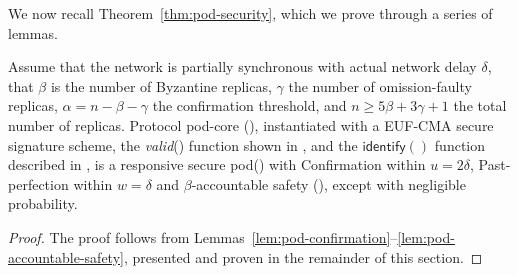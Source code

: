 \documentclass[pdflatex,sn-mathphys-num]{sn-jnl}%
\theoremstyle{thmstyleone}%
\theoremstyle{thmstyletwo}%
\theoremstyle{thmstylethree}%
\newenvironment{customthm}[1]
{\renewcommand\theinnercustomthm{#1}\innercustomthm}
{\endinnercustomthm}
\newcommand{\podtm}{\textsf{pod}\xspace}
\newcommand{\oa}[1]{{\color{blue}{ #1 }}}
\newcommand{\op}[1]{\textsl{#1}}
\newcommand{\opValid}[1]{\op{valid}(#1)\xspace}
\newcommand{\operand}[1]{\textsf{#1}}
\newcommand{\round}{\operand{r}\xspace}
\newcommand{\rmax}{\ensuremath{\round_\text{max}}\xspace}
\newcommand{\rperf}{\ensuremath{\round_\text{perf}}\xspace}
\newcommand{\mrt}{\operand{mrt}\xspace}
\newcommand{\identify}[1]{\ensuremath{\mathsf{identify}(#1)}\xspace}
\newcommand{\parConf}{\ensuremath{u}\xspace}
\newcommand{\parPerf}{\ensuremath{w}\xspace}
\let\oldalpha\alpha
\renewcommand{\alpha}{\ensuremath{\oldalpha}\xspace}
\let\oldbeta\beta
\renewcommand{\beta}{\ensuremath{\oldbeta}\xspace}
\let\oldgamma\gamma
\renewcommand{\gamma}{\ensuremath{\oldgamma}\xspace}
\newcommand{\ewnp}{except with negligible probability\xspace}
\begin{document}
\begin{appendices}

\noindent

We now recall Theorem~\ref{thm:pod-security}, which we prove through a series of lemmas.

\begin{customthm}{\ref{thm:pod-security}}[\podtm-core security]
	Assume that the network is partially synchronous with actual network delay $\delta$, that \beta is the number of Byzantine replicas, \gamma the number of omission-faulty replicas, $\alpha = n - \beta - \gamma$ the confirmation threshold, and $n \geq 5 \beta + 3 \gamma + 1$ the total number of replicas. Protocol \podtm-core (), instantiated with a EUF-CMA secure signature scheme, the \opValid{} function shown in , and the \identify{} function described in , is a responsive secure \podtm () with Confirmation within $\parConf = 2 \delta$, Past-perfection within $\parPerf = \delta$ and  \beta-accountable safety (), \ewnp.
\end{customthm}
\begin{proof}
	The proof follows from Lemmas~\ref{lem:pod-confirmation}--\ref{lem:pod-accountable-safety}, presented and proven in the remainder of this section.
\end{proof}


\end{appendices}
\end{document}
